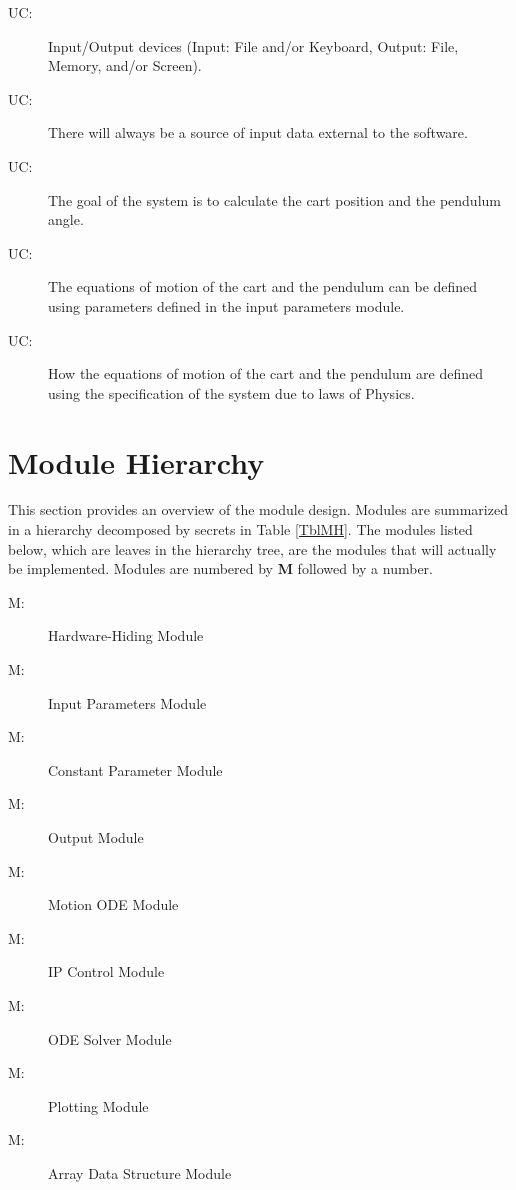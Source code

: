 \documentclass[12pt, titlepage]{article}
\newcounter{ucnum}
\newcommand{\uctheucnum}{UC\theucnum}
\newcounter{mnum}
\newcommand{\mthemnum}{M\themnum}
\begin{document}
\begin{description}
\item[ \uctheucnum \label{ucIO}:] Input/Output devices (Input: File and/or Keyboard, Output: File, Memory, and/or Screen).
\item[ \uctheucnum \label{ucInput}:] There will always be a source of input data external to the software.
\item[ \uctheucnum \label{ucGoal}:] The goal of the system is to calculate the cart position and the pendulum angle.
\item[ \uctheucnum \label{ucODEstructureC}:] The equations of motion of the cart and the pendulum can be defined using parameters defined in the input parameters module.
\item[ \uctheucnum \label{ucEqM}:] How the equations of motion of the cart and the pendulum are defined using the specification of the system due to laws of Physics.
 
\end{description}

\section{Module Hierarchy} \label{SecMH}

This section provides an overview of the module design. Modules are summarized in a hierarchy decomposed by secrets in Table \ref{TblMH}. The modules listed below, which are leaves in the hierarchy tree, are the modules that will actually be implemented. Modules are numbered by \textbf{M} followed by a number. 

\begin{description}
\item [ \mthemnum \label{mHH}:] Hardware-Hiding Module
\item [ \mthemnum \label{mParams}:] Input Parameters Module
\item [ \mthemnum \label{mCons}:] 
Constant Parameter Module
\item [ \mthemnum \label{mOutput}:] Output Module
\item [ \mthemnum \label{mODEC}:] Motion ODE  Module

\item [ \mthemnum \label{mControl}:] IP Control Module
\item [ \mthemnum \label{mSolver}:] ODE Solver Module
\item [ \mthemnum \label{mPlot}:] Plotting Module
\item [ \mthemnum \label{mDS}:]
Array Data Structure Module
\end{description}
\end{document}
